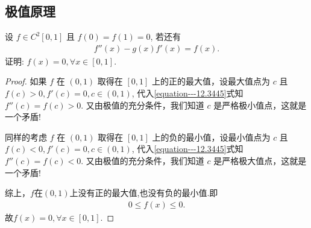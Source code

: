 \documentclass[../../main.tex]{subfiles}
\begin{document}
\subsection{极值原理}

\begin{example}
设 $f\in C^2[0,1]$ 且 $f(0)=f(1)=0$, 若还有
\begin{align}
f''(x)-g(x)f'(x)=f(x).
\label{equation---12.3445}
\end{align}
证明:
$f(x)=0,\forall x\in[0,1]$.
\end{example}
\begin{proof}
如果 $f$ 在 $(0,1)$ 取得在 $[0,1]$ 上的正的最大值，设最大值点为 $c$ 且 $f(c)>0,f'(c)=0,c\in(0,1)$, 代入\eqref{equation---12.3445}式知 $f''(c)=f(c)>0$. 又由极值的充分条件，我们知道 $c$ 是严格极小值点，这就是一个矛盾!

同样的考虑 $f$ 在 $(0,1)$ 取得在 $[0,1]$ 上的负的最小值，设最小值点为 $c$ 且 $f(c)<0,f'(c)=0,c\in(0,1)$, 代入\eqref{equation---12.3445}式知 $f''(c)=f(c)<0$. 又由极值的充分条件，我们知道 $c$ 是严格极大值点，这就是一个矛盾!

综上，$f$在$(0,1)$上没有正的最大值,也没有负的最小值.即
\begin{align*}
0\leqslant f(x)\leqslant0.
\end{align*}
故$f(x)=0,\forall x\in[0,1]$. 

\end{proof}
\end{document}
